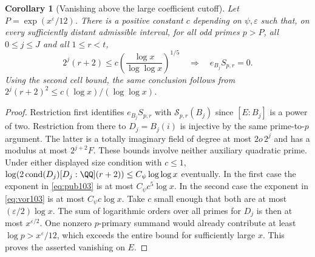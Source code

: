 \documentclass[a4paper,11pt]{article}
\newtheorem{corollary}[proposition]{Corollary}
\theoremstyle{definition}
\theoremstyle{remark}
\numberwithin{equation}{section}
\newcommand{\Sel}{\mathcal S}
\begin{document}
\begin{corollary}[Vanishing above the large coefficient cutoff]
\label{cor:cut197}
Let \(P=\exp(x^\varepsilon/12)\). There is a positive constant
\(c\) depending on \(\psi,\varepsilon\) such that, on every
sufficiently distant admissible interval, for all odd primes
\(p>P\), all \(0\le j\le J\) and all \(1\le r<t\),
\[
 2^j(r+2)\le c\left(\frac{\log x}{\log\log x}\right)^{1/5}
        \quad\Longrightarrow\quad e_{B_j}S_{p,r}=0 .
\]
Using the second cell bound, the same conclusion follows from
\(2^j(r+2)^2\le c(\log x)/(\log\log x)\).
\end{corollary}
\begin{proof}
Restriction first identifies \(e_{B_j}S_{p,r}\) with
\(\Sel_{p,r}(B_j)\) since \([E:B_j]\) is a power of two.
Restriction from there to \(D_j=B_j(i)\) is injective by the
same prime-to-\(p\) argument. The latter is a totally imaginary
field of degree at most \(2o\,2^j\) and has a modulus at most
\(2^{j+2}F\). These bounds involve neither auxiliary quadratic
prime. Under either displayed size condition with \(c\le1\),
\(\log(2\operatorname{cond}(D_j)[D_j:\QQ](r+2))
\le C_\psi\log\log x\) eventually. In the first case the
exponent in \eqref{eq:pub103} is at most \(C_\psi c^5\log x\).
In the second case the exponent in \eqref{eq:vor103} is at
most \(C_\psi c\log x\). Take \(c\) small enough that both
are at most \((\varepsilon/2)\log x\). The sum of logarithmic
orders over all primes for \(D_j\) is then at most
\(x^{\varepsilon/2}\). One nonzero \(p\)-primary summand would
already contribute at least \(\log p>x^\varepsilon/12\), which
exceeds the entire bound for sufficiently large \(x\).
This proves the asserted vanishing on \(E\).
\end{proof}
\end{document}
